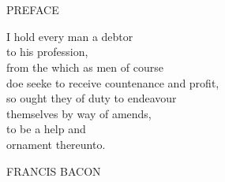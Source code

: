 \section*{}
\begin{center}
PREFACE
\end{center}

\noindent
I hold every man a debtor\\
to his profession,\\
from the which as men of course\\
doe seeke to receive countenance and profit,\\
so ought they of duty to endeavour\\
themselves by way of amends,\\
to be a help and\\
ornament thereunto.

\begin{flushright}
FRANCIS BACON
\end{flushright}